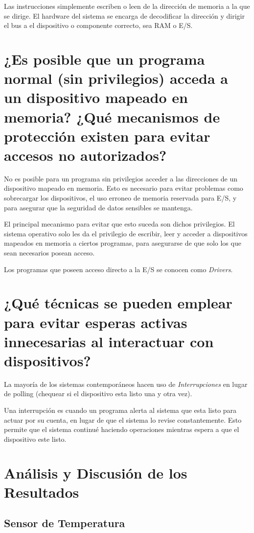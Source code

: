\documentclass[titlepage]{article}
\begin{document}
Las instrucciones simplemente escriben o leen de la dirección de memoria a la que se dirige. El hardware del sistema se encarga de decodificar la dirección y dirigir el bus a el dispositivo o componente correcto, sea RAM o E/S.

\section*{¿Es posible que un programa normal (sin privilegios) acceda a un dispositivo mapeado en memoria? ¿Qué mecanismos de protección existen para evitar accesos no autorizados?}

No es posible para un programa sin privilegios acceder a las direcciones de un dispositivo mapeado en memoria. Esto es necesario para evitar problemas como sobrecargar los dispositivos, el uso erroneo de memoria reservada para E/S, y para asegurar que la seguridad de datos sensibles se mantenga.

El principal mecanismo para evitar que esto suceda son dichos privilegios. El sistema operativo solo les da el privilegio de escribir, leer y acceder a dispositivos mapeados en memoria a ciertos programas, para asegurarse de que solo los que sean necesarios posean acceso.

Los programas que poseen acceso directo a la E/S se conocen como \emph{Drivers}.

\section*{¿Qué técnicas se pueden emplear para evitar esperas activas innecesarias al interactuar con dispositivos?}

La mayoría de los sistemas contemporáneos hacen uso de \emph{Interrupciones} en lugar de polling (chequear si el dispositivo esta listo una y otra vez).

Una interrupción es cuando un programa alerta al sistema que esta listo para actuar por su cuenta, en lugar de que el sistema lo revise constantemente. Esto permite que el sistema continué haciendo operaciones mientras espera a que el dispositivo este listo.

\section*{Análisis y Discusión de los Resultados}

\subsection{Sensor de Temperatura}
\end{document}

